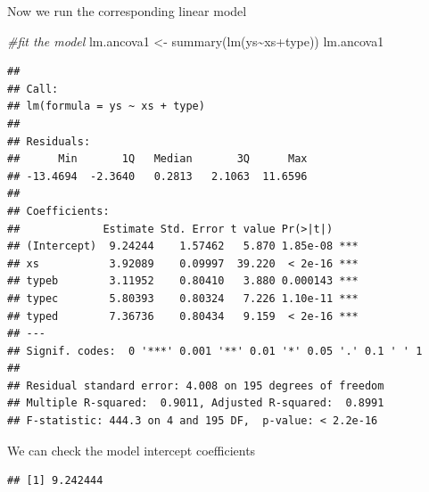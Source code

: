 \documentclass[
]{book}
\newenvironment{Shaded}{\begin{snugshade}}{\end{snugshade}}
\newcommand{\CommentTok}[1]{\textcolor[rgb]{0.56,0.35,0.01}{\textit{#1}}}
\newcommand{\DecValTok}[1]{\textcolor[rgb]{0.00,0.00,0.81}{#1}}
\newcommand{\FunctionTok}[1]{\textcolor[rgb]{0.00,0.00,0.00}{#1}}
\newcommand{\NormalTok}[1]{#1}
\newcommand{\OtherTok}[1]{\textcolor[rgb]{0.56,0.35,0.01}{#1}}
\newcommand{\SpecialCharTok}[1]{\textcolor[rgb]{0.00,0.00,0.00}{#1}}
\begin{document}
Now we run the corresponding linear model

\begin{Shaded}
\begin{Highlighting}[]
\CommentTok{\#fit the model}
\NormalTok{lm.ancova1 }\OtherTok{\textless{}{-}} \FunctionTok{summary}\NormalTok{(}\FunctionTok{lm}\NormalTok{(ys}\SpecialCharTok{\textasciitilde{}}\NormalTok{xs}\SpecialCharTok{+}\NormalTok{type))}
\NormalTok{lm.ancova1}
\end{Highlighting}
\end{Shaded}

\begin{verbatim}
## 
## Call:
## lm(formula = ys ~ xs + type)
## 
## Residuals:
##      Min       1Q   Median       3Q      Max 
## -13.4694  -2.3640   0.2813   2.1063  11.6596 
## 
## Coefficients:
##             Estimate Std. Error t value Pr(>|t|)    
## (Intercept)  9.24244    1.57462   5.870 1.85e-08 ***
## xs           3.92089    0.09997  39.220  < 2e-16 ***
## typeb        3.11952    0.80410   3.880 0.000143 ***
## typec        5.80393    0.80324   7.226 1.10e-11 ***
## typed        7.36736    0.80434   9.159  < 2e-16 ***
## ---
## Signif. codes:  0 '***' 0.001 '**' 0.01 '*' 0.05 '.' 0.1 ' ' 1
## 
## Residual standard error: 4.008 on 195 degrees of freedom
## Multiple R-squared:  0.9011, Adjusted R-squared:  0.8991 
## F-statistic: 444.3 on 4 and 195 DF,  p-value: < 2.2e-16
\end{verbatim}

We can check the model intercept coefficients

\begin{Shaded}
\end{Shaded}

\begin{verbatim}
## [1] 9.242444
\end{verbatim}

\begin{Shaded}
\end{Shaded}
\end{document}
